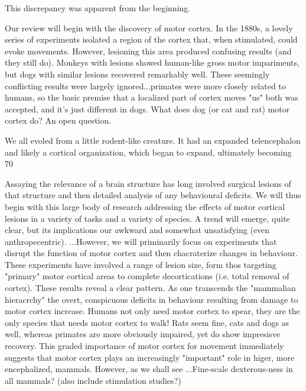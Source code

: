 This discrepancy was apparent from the beginning.

Our review will begin with the discovery of motor cortex. In the 1880s, a lovely series of experiments isolated a region of the cortex that, when stimulated, could evoke movements. However, lesioning this area produced confusing results (and they still do). Monkeys with lesions showed human-like gross motor impariments, but dogs with similar lesions recovered remarkably well. These seemingly conflicting results were largely ignored...primates were more closely related to humans, so the basic premise that a localized part of cortex moves "us" both was accepted, and it's just different in dogs. What does dog (or cat and rat) motor cortex do? An open question.

We all evoled from a little rodent-like creature. It had an expanded telencephalon and likely a cortical organization, which began to expand, ultimately becoming 70%

Assaying the relevance of a brain structure has long involved surgical lesions of that structure and then detailed analysis of any behavioural deficits. We will thus begin with this large body of research addressing the effects of motor cortical lesions in a variety of tasks and a variety of species. A trend will emerge, quite clear, but its implications our awkward and somewhat unsatisfying (even anthropecentric).
...However, we will priminarily focus on experiments that disrupt the function of motor cortex and then chacraterize changes in behaviour. These experiments have involved a range of lesion size, form thos targeting "primary" motor cortical areas to complete decortications (i.e. total removal of cortex). These results reveal a clear pattern. As one transcends the "mammalian hieracrchy" the overt, conspicuous deficits in behaviour resulting from damage to motor cortex increase. Humans not only need motor cortex to spear, they are the only species that needs motor cortex to walk! Rats seem fine, cats and dogs as well, whereas primates are more obviously impaired, yet do show impresisve recovery. This graded importance of motor cortex for movement immediately suggests that motor cortex plays an increasingly "important" role in higer, more encephalized, mammals. However, as we shall see
...Fine-scale dexterous-ness in all mammals?
(also include stimulation studies?)

